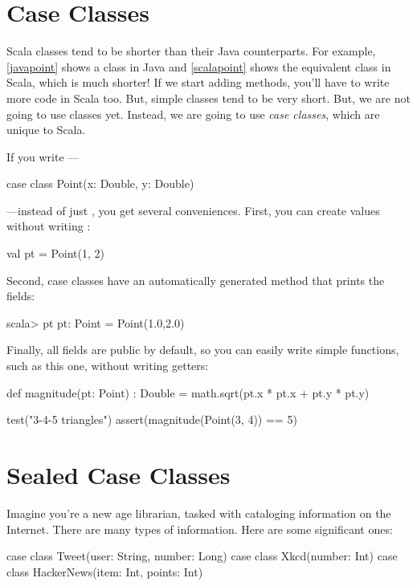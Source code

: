 \documentclass{book}
\begin{document}
\section{Case Classes}

Scala classes tend to be shorter than their
Java counterparts. For example, \cref{javapoint} shows a  class
in Java and \cref{scalapoint} shows the equivalent class in Scala, which
is much shorter!
If we start adding methods, you'll have to write
more code in Scala too. But, simple classes tend to be very short.
But, we are not going to use classes yet. Instead, we are going to use
\emph{case classes}, which are unique to Scala.

If you write ---
%
\begin{scalacode}
case class Point(x: Double, y: Double)
\end{scalacode}
---instead of just , you get several conveniences.
First, you can create values without writing :
%
\begin{scalacode}
val pt = Point(1, 2)
\end{scalacode}
%
Second, case classes have an automatically generated 
method that prints the fields:
%
\begin{console}
scala> pt
pt: Point = Point(1.0,2.0)
\end{console}
%
Finally, all fields are public by default, so you can easily write simple
functions, such as this one, without writing getters:
%
\begin{scalacode}
def magnitude(pt: Point) : Double = {
  math.sqrt(pt.x * pt.x + pt.y * pt.y)
}

test("3-4-5 triangles") {
  assert(magnitude(Point(3, 4)) == 5)
}
\end{scalacode}

\section{Sealed Case Classes}

Imagine you're a new age librarian, tasked with cataloging information on the
Internet. There are many types of information. Here are some significant ones:

\begin{scalacode}
case class Tweet(user: String, number: Long)
case class Xkcd(number: Int)
case class HackerNews(item: Int, points: Int)
\end{scalacode}
\end{document}
